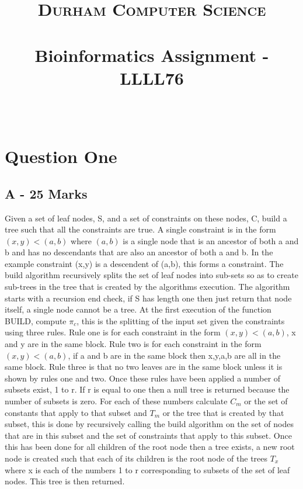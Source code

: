 \documentclass[paper=a4, fontsize=11pt]{scrartcl}
\date{}
\title{
		\vspace{-1in} 	
		\usefont{OT1}{bch}{b}{n}
		\normalfont \normalsize \textsc{Durham Computer Science} \\ [5pt]
		\horrule{0.5pt} \\[0.4cm]
		\large  Bioinformatics Assignment - LLLL76\\
		\horrule{2pt} \\[0.5cm]
		\vspace{-1in} 	
}
\numberwithin{equation}{section}		%
\numberwithin{figure}{section}			%
\numberwithin{table}{section}				%
\begin{document}
\maketitle
\section*{Question One}

\iffalse
This question is about the Build algorithm from A. V. Aho, Y. Sagiv, T. G. Szymanski, J. D. Ullman. Inferring a tree from lowest common ancestors with an application to the optimization of relational expressions. SIAM Journal on Computing
\fi

\subsection*{A - 25 Marks}

\iffalse
Explain what the algorithm does and how it works in your own words. Do not use pseudocode
\fi

Given a set of leaf nodes, S, and a set of constraints on these nodes, C, build a tree such that all the constraints are true. A single constraint is in the form $(x, y) < (a,b)$ where $(a,b)$ is a single node that is an ancestor of both a and b and has no descendants that are also an ancestor of both a and b. In the example constraint (x,y) is a descendent of (a,b), this forms a constraint. The build algorithm recursively splits the set of leaf nodes into sub-sets so as to create sub-trees in the tree that is created by the algorithms execution. The algorithm starts with a recursion end check, if S has length one then just return that node itself, a single node cannot be a tree. At the first execution of the function BUILD, compute $\pi_c$, this is the splitting of the input set given the constraints using three rules. Rule one is for each constraint in the form $(x, y) < (a,b)$, x and y are in the same block. Rule two is for each constraint in the form $(x, y) < (a,b)$, if a and b are in the same block then x,y,a,b are all in the same block. Rule three is that no two leaves are in the same block unless it is shown by rules one and two. Once these rules have been applied a number of subsets exist, 1 to r. If r is equal to one then a null tree is returned because the number of subsets is zero. For each of these numbers calculate $C_m$ or the set of constants that apply to that subset and $T_m$ or the tree that is created by that subset, this is done by recursively calling the build algorithm on the set of nodes that are in this subset and the set of constraints that apply to this subset. Once this has been done for all children of the root node then a tree exists, a new root node is created such that each of its children is the root node of the trees $T_x$ where x is each of the numbers 1 to r corresponding to subsets of the set of leaf nodes. This tree is then returned. 
\end{document}
